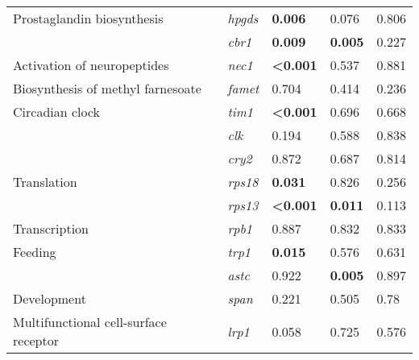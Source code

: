 \begin{table}[]
\begin{tabular}{@{}lllll@{}}
Prostaglandin biosynthesis             & \textit{hpgds}  & \textbf{0.006}           & 0.076                    & 0.806                 \\
                                       & \textit{cbr1}   & \textbf{0.009}           & \textbf{0.005}           & 0.227                 \\
Activation of neuropeptides            & \textit{nec1}   & \textbf{\textless 0.001} & 0.537                    & 0.881                 \\
Biosynthesis of methyl farnesoate      & \textit{famet}  & 0.704                    & 0.414                    & 0.236                 \\
Circadian clock                        & \textit{tim1}   & \textbf{\textless 0.001} & 0.696                    & 0.668                 \\
                                       & \textit{clk}    & 0.194                    & 0.588                    & 0.838                 \\
                                       & \textit{cry2}   & 0.872                    & 0.687                    & 0.814                 \\
Translation                            & \textit{rps18}  & \textbf{0.031}           & 0.826                    & 0.256                 \\
                                       & \textit{rps13}  & \textbf{\textless 0.001} & \textbf{0.011}           & 0.113                 \\
Transcription                          & \textit{rpb1}   & 0.887                    & 0.832                    & 0.833                 \\
Feeding                                & \textit{trp1}   & \textbf{0.015}           & 0.576                    & 0.631                 \\
                                       & \textit{astc}   & 0.922                    & \textbf{0.005}           & 0.897                 \\
Development                            & \textit{span}   & 0.221                    & 0.505                    & 0.78                  \\
Multifunctional  cell-surface receptor & \textit{lrp1}   & 0.058                    & 0.725                    & 0.576                 \\ \bottomrule
\end{tabular}
\end{table}


